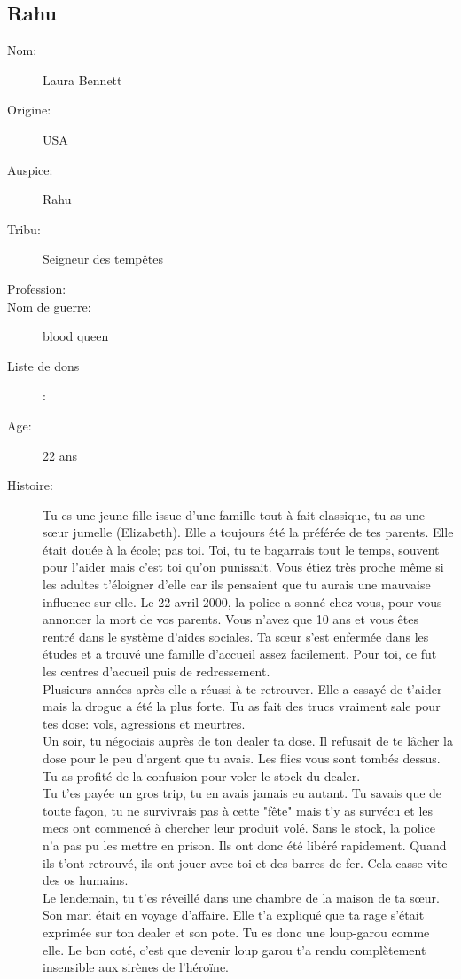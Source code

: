 \documentclass[oneside,12pt]{book}
\begin{document}
\begin{flushleft}
\clearpage
\section{Rahu}
\begin{description}
\item[Nom:]{Laura Bennett}
\item[Origine:]{USA}
\item[Auspice:]{Rahu}
\item[Tribu:]{Seigneur des tempêtes}
\item[Profession:]{}
\item[Nom de guerre:]{blood queen}
\item[Liste de dons]:
\item[Age:]{22 ans}
\item[Histoire:]{
{\footnotesize Tu es une jeune fille issue d'une famille tout à fait classique, tu as une sœur jumelle (Elizabeth). Elle a toujours été la préférée de tes parents. Elle était douée à la école; pas toi. Toi, tu te bagarrais tout le temps, souvent
pour l'aider mais c'est toi qu'on punissait.
Vous étiez très proche même si les adultes t'éloigner d'elle car ils pensaient que tu aurais une mauvaise influence sur elle. Le 22 avril 2000, la police a sonné chez vous, pour vous annoncer la mort de vos parents.
Vous n'avez que 10 ans et vous êtes rentré dans le système d'aides sociales. Ta sœur s'est enfermée dans les études et a trouvé une famille d'accueil assez facilement. Pour toi, ce fut les centres d’accueil puis de redressement.\\
Plusieurs années après elle a réussi à te retrouver. Elle a essayé de t’aider mais la drogue a été la plus forte.  Tu as fait des trucs vraiment sale pour tes dose: vols, agressions et meurtres.\\
Un soir, tu négociais auprès de ton dealer ta dose. Il refusait de te lâcher la dose pour le peu d'argent que tu avais. Les flics vous sont tombés dessus. Tu as profité de la confusion pour voler le stock du dealer.\\
Tu t'es payée un gros trip, tu en avais jamais eu autant. Tu savais que de toute façon, tu ne survivrais pas à cette "fête" mais t'y as survécu et les mecs ont commencé à chercher leur produit volé. Sans le stock, la police
n'a pas pu les mettre en prison. Ils ont donc été libéré rapidement. Quand ils t'ont retrouvé, ils ont jouer avec toi et des barres de fer. Cela casse vite des os humains.\\
Le lendemain, tu t’es réveillé dans une chambre de la maison de ta sœur. Son mari était en voyage d'affaire. Elle t'a expliqué que ta rage s'était exprimée sur ton dealer et son pote. Tu es donc une loup-garou comme elle. Le bon coté, c'est que devenir loup garou t'a rendu complètement insensible aux sirènes de l'héroïne. \\
}}
\end{description}
\end{flushleft}
\end{document}
